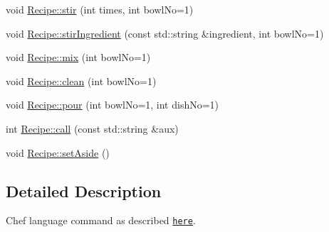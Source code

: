 \begin{DoxyCompactItemize}
\item 
void \hyperlink{group__Command_ga5b48c67eb04fc71c199bdf611c387c9e}{Recipe\-::stir} (int times, int bowl\-No=1)
\item 
void \hyperlink{group__Command_gaa27e4367ef81507d9e9308230cc44c0d}{Recipe\-::stir\-Ingredient} (const std\-::string \&ingredient, int bowl\-No=1)
\item 
void \hyperlink{group__Command_gad9a02b3a48b606ba17dc91337c3f64c2}{Recipe\-::mix} (int bowl\-No=1)
\item 
void \hyperlink{group__Command_gae041e0eb15d1e40fe513b53803810dac}{Recipe\-::clean} (int bowl\-No=1)
\item 
void \hyperlink{group__Command_ga03848074a9e527439e6381e47d9f3749}{Recipe\-::pour} (int bowl\-No=1, int dish\-No=1)
\item 
int \hyperlink{group__Command_gab7d94d3b379ae3f1ada2c010510c3b43}{Recipe\-::call} (const std\-::string \&aux)
\item 
void \hyperlink{group__Command_ga4889710ccae668fb039e4dfa0ea2dae7}{Recipe\-::set\-Aside} ()
\end{DoxyCompactItemize}


\subsection{Detailed Description}
Chef language command as described \href{http://www.dangermouse.net/esoteric/chef.html}{\tt here}. 

